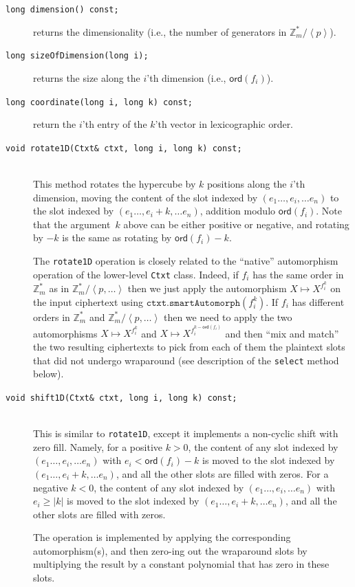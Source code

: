 \documentclass[14pt]{extarticle}
\newcommand{\Z}{\mathbb{Z}}
\newcommand{\grp}[1]{\left\langle #1 \right\rangle}
\def\ord{\mathsf{ord}}
\begin{document}
\begin{description}
\item[\texttt{long dimension() const;}] returns the dimensionality
(i.e., the number of generators in $\Z_m^*/\grp{p}$).

\item[\texttt{long sizeOfDimension(long i);}] returns the size along
the $i$'th dimension (i.e., $\ord(f_i)$).

\item[\texttt{long coordinate(long i, long k) const;}] return the
$i$'th entry of the $k$'th vector in lexicographic order.

\item[\texttt{void rotate1D(Ctxt\& ctxt, long i, long k) const;}]\ \\
This method rotates the hypercube by $k$ positions along the $i$'th
dimension, moving the content of the slot indexed by $(e_1 \ldots,e_i,
\ldots e_n)$ to the slot indexed by $(e_1 \ldots,e_i+k,\ldots e_n)$,
addition modulo $\ord(f_i)$. Note
that the argument~$k$ above can be either positive or negative, and
rotating by $-k$ is the same as rotating by $\ord(f_i)-k$.

The \texttt{rotate1D} operation is closely related to the ``native''
automorphism operation of the lower-level \texttt{Ctxt} class. Indeed,
if $f_i$ has the same order in $\Z_m^*$ as in $\Z_m^*/\grp{p,\ldots}$
then we just apply the automorphism $X\mapsto X^{f_i^k}$ on the input
ciphertext using $\mathtt{ctxt.smartAutomorph}(f_i^k)$. If $f_i$ has
different orders in $\Z_m^*$ and $\Z_m^*/\grp{p,\ldots}$ then we need
to apply the two automorphisms $X\mapsto X^{f_i^k}$ and  $X\mapsto
X^{f_i^{k-\ord(f_i)}}$ and then ``mix and match'' the two resulting
ciphertexts to pick from each of them the plaintext slots that did not
undergo wraparound (see description of the \texttt{select} method
below).

\item[\texttt{void shift1D(Ctxt\& ctxt, long i, long k) const;}]\ \\
This is similar to \texttt{rotate1D}, except it implements a
non-cyclic shift with zero fill. Namely, for a positive $k>0$, the
content of any slot indexed by $(e_1 \ldots,e_i,\ldots e_n)$ with
$e_i<\ord(f_i)-k$ is moved to the slot indexed by  $(e_1 \ldots,e_i+k,
\ldots e_n)$, and all the other slots are filled with zeros. For a
negative $k<0$, the content of any slot indexed by $(e_1 \ldots,e_i,
\ldots e_n)$ with $e_i\ge|k|$ is moved to the slot indexed by  $(e_1
\ldots,e_i+k,\ldots e_n)$, and all the other slots are filled with
zeros.

The operation is implemented by applying the corresponding
automorphism(s), and then zero-ing out the wraparound slots by
multiplying the result by a constant polynomial that has zero in
these slots.
\end{description}
\end{document}
